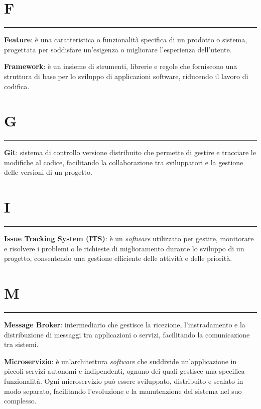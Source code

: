 \section*{F}
{\color{lightgray}\rule{\textwidth}{0.4pt}} %
\begin{glossaryitemize}
    \item \textbf{Feature}: è una caratteristica o funzionalità specifica di un prodotto o sistema, progettata per soddisfare un'esigenza o migliorare l'esperienza dell'utente.
    \item \textbf{Framework}: è un insieme di strumenti, librerie e regole che forniscono una struttura di base per lo sviluppo di applicazioni software, riducendo il lavoro di codifica.
\end{glossaryitemize}

\section*{G}
{\color{lightgray}\rule{\textwidth}{0.4pt}} %
\begin{glossaryitemize}
    \item \textbf{Git}: sistema di controllo versione distribuito che permette di gestire e tracciare le modifiche al codice, facilitando la collaborazione tra sviluppatori e la gestione delle versioni di un progetto.
\end{glossaryitemize}

\section*{I}
{\color{lightgray}\rule{\textwidth}{0.4pt}} %
\begin{glossaryitemize}
    \item \textbf{Issue Tracking System (ITS)}: è un \textit{software} utilizzato per gestire, monitorare e risolvere i problemi o le richieste di miglioramento durante lo sviluppo di un progetto, consentendo una gestione efficiente delle attività e delle priorità.
\end{glossaryitemize}

\section*{M}
{\color{lightgray}\rule{\textwidth}{0.4pt}} %
\begin{glossaryitemize}
    \item \textbf{Message Broker}: intermediario che gestisce la ricezione, l'instradamento e la distribuzione di messaggi tra applicazioni o servizi, facilitando la comunicazione tra sistemi.
    \item \textbf{Microservizio}: è un'architettura \textit{software} che suddivide un'applicazione in piccoli servizi autonomi e indipendenti, ognuno dei quali gestisce una specifica funzionalità. Ogni microservizio può essere sviluppato, distribuito e scalato in modo separato, facilitando l'evoluzione e la manutenzione del sistema nel suo complesso.
\end{glossaryitemize}

